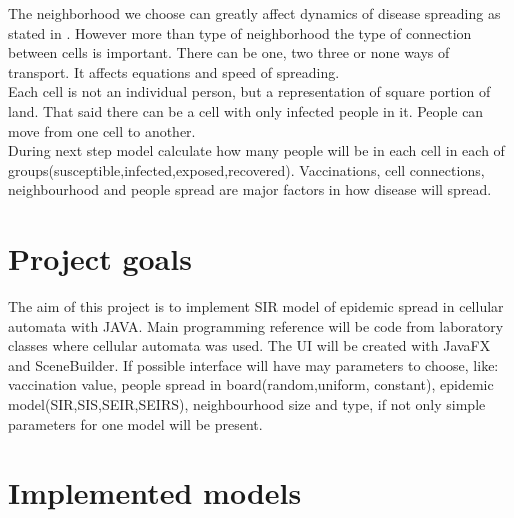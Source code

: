 \documentclass[a4paper, 11pt]{article}
\begin{document}
	The neighborhood we choose can greatly affect dynamics of disease spreading as stated in \cite{cisse}. However more than type of neighborhood the type of connection between cells is important. There can be one, two three or none ways of transport. It affects equations and speed of spreading.\cite{WHITE} \\
	
	Each cell is not an individual person, but a representation of square portion of land. That said there can be a cell with only infected people in it. People can move from one cell to another.\cite{WHITE}  \\
	
	During next step model calculate how many people will be in each cell in each of groups(susceptible,infected,exposed,recovered). Vaccinations, cell connections, neighbourhood and people spread are major factors in how disease will spread.
\section{Project goals}

The aim of this project is to implement SIR model of epidemic spread in cellular automata with JAVA. Main programming reference will be code from laboratory classes where cellular automata was used. The UI will be created with JavaFX and SceneBuilder. If possible interface  will have may parameters to choose, like: vaccination value,  people spread in board(random,uniform, constant), epidemic model(SIR,SIS,SEIR,SEIRS), neighbourhood size and type, if not only simple parameters for one model will be present. 

\section{Implemented models}
\end{document}
